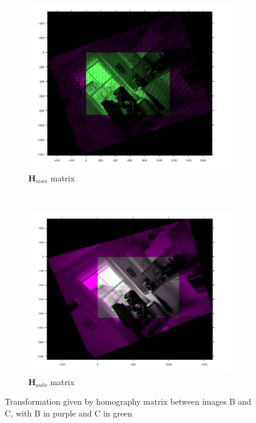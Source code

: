 \documentclass[a4paper, 10pt, conference]{ieeeconf}
\begin{document}
\begin{figure}[!ht]
  \captionsetup[subfigure]{position=b}
  \centering
    \begin{subfigure}{0.45\linewidth}
      \includegraphics[width=\textwidth]{pic/q2_1_b1_BC_pair}
      \caption{$\textbf{H}_{man}$ matrix}
      \label{fig:manHomog}
    \end{subfigure}
    ~
    \begin{subfigure}{0.45\linewidth}
      \includegraphics[width=\textwidth]{pic/q2_1_b2_BC_pair}
      \caption{$\textbf{H}_{auto}$ matrix}
      \label{fig:autoHomog}
    \end{subfigure}

	\caption{Transformation given by homography matrix between images B and C, with B in purple and C in green}
    \vspace{-0.5cm}

  \label{fig:matchBC}
\end{figure}
\end{document}
